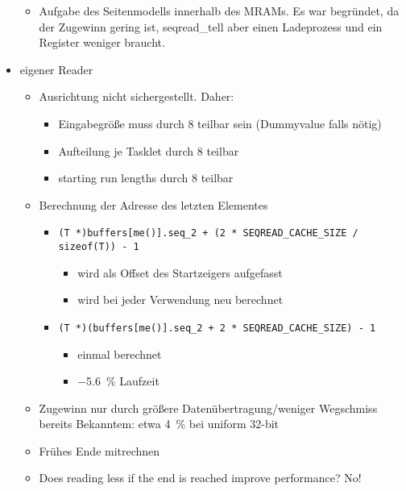 \begin{itemize}
\begin{itemize}
		\item
		Aufgabe des Seitenmodells innerhalb des MRAMs.
		Es war begründet, da der Zugewinn gering ist, seqread\_tell aber einen Ladeprozess und ein Register weniger braucht.
	\end{itemize}

	\item
	eigener Reader
	\begin{itemize}
		\item
		Ausrichtung nicht sichergestellt. Daher:
		\begin{itemize}
			\item
			Eingabegröße muss durch 8 teilbar sein (Dummyvalue falls nötig)

			\item
			Aufteilung je Tasklet durch 8 teilbar

			\item
			starting run lengths durch 8 teilbar
		\end{itemize}

		\item
		Berechnung der Adresse des letzten Elementes
		\begin{itemize}
			\item
			\lstinline|(T *)buffers[me()].seq_2 + (2 * SEQREAD_CACHE_SIZE / sizeof(T)) - 1|
			\begin{itemize}
				\item
				wird als Offset des Startzeigers aufgefasst

				\item
				wird bei jeder Verwendung neu berechnet
			\end{itemize}

			\item
			\lstinline|(T *)(buffers[me()].seq_2 + 2 * SEQREAD_CACHE_SIZE) - 1|
			\begin{itemize}
				\item
				einmal berechnet

				\item
				\qty{-5,6}{\percent} Laufzeit
			\end{itemize}
		\end{itemize}

		\item
		Zugewinn nur durch größere Datenübertragung/weniger Wegschmiss bereits Bekanntem: etwa \qty{4}{\percent} bei uniform 32-bit

		\item
		Frühes Ende mitrechnen

		\item
		Does reading less if the end is reached improve performance? No!


\end{itemize}
\end{itemize}
